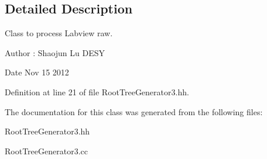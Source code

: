 \subsection{Detailed Description}
Class to process Labview raw. 

\begin{DoxyAuthor}{Author}
\-: Shaojun Lu D\-E\-S\-Y 
\end{DoxyAuthor}
\begin{DoxyDate}{Date}
Nov 15 2012 
\end{DoxyDate}


Definition at line 21 of file Root\-Tree\-Generator3.\-hh.



The documentation for this class was generated from the following files\-:\begin{DoxyCompactItemize}
\item 
Root\-Tree\-Generator3.\-hh\item 
Root\-Tree\-Generator3.\-cc\end{DoxyCompactItemize}
